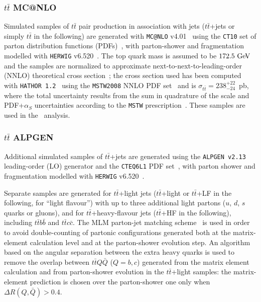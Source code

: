 

\subsubsection{$t\bar{t}$ MC@NLO}\label{subsec:MC@NLO}
Simulated samples of $t\bar{t}$ pair production  in association with jets 
($t\bar{t}$+jets or simply $t\bar{t}$ in the following)
are generated with {\tt MC@NLO} v4.01~\cite{mcatnlo_1,mcatnlo_2,mcatnlo_3} using the {\tt CT10} set of parton distribution functions (PDFs)~\cite{ct10},
with parton-shower and fragmentation modelled with
{\tt HERWIG} v6.520~\cite{HERWIG}.
The top quark mass is assumed to be  $172.5\gev$ and 
the samples are normalized to approximate next-to-next-to-leading-order 
(NNLO) theoretical cross section~\cite{ttbarxs}; the cross section used 
has been computed with {\tt HATHOR 1.2}~\cite{ttbarxs} using the {\tt MSTW2008}
NNLO PDF set~\cite{Martin:2009iq} and is $\sigma_{t\bar{t}}= 238^{+22}_{-24}$~pb, 
where the total uncertainty results from the sum in quadrature of the 
scale and PDF+$\alpha_S$ uncertainties according to 
the {\tt MSTW} prescription~\cite{mstw2}. 
These samples are used in the \wbx\ analysis.

\subsubsection{$t\bar{t}$ ALPGEN}\label{subsec:alpgen}
Additional simulated samples of $t\bar{t}$+jets are generated using
the {\tt ALPGEN v2.13}~\cite{ALPGEN} leading-order (LO) generator and the 
{\tt CTEQ6L1} PDF set~\cite{cteq6}, with parton shower and fragmentation  
modelled with {\tt HERWIG} v6.520~\cite{HERWIG}.

Separate samples are generated for $t\bar{t}$+light jets ($t\bar{t}$+light 
or $t\bar{t}$+LF in the following, for ``light flavour'') 
with up to three additional light partons ($u$, $d$, $s$ quarks or gluons),
and for $t\bar{t}$+heavy-flavour jets ($t\bar{t}$+HF in the following), 
including $t\bar{t}b\bar{b}$ and
$t\bar{t}c\bar{c}$.  
The MLM parton-jet matching scheme~\cite{mlm} is used
in order to avoid double-counting  of partonic configurations
generated both at the matrix-element calculation level
and at the parton-shower evolution step.
An algorithm based on the angular separation
between the extra heavy quarks is used to remove 
the overlap between $t\bar{t}Q\bar{Q}$ ($Q=b,c$) 
generated from the matrix element calculation and 
from parton-shower evolution in the  $t\bar{t}$+light samples: 
the matrix-element prediction is chosen over the parton-shower one
only when $\Delta R(Q,\bar{Q})>0.4$.

